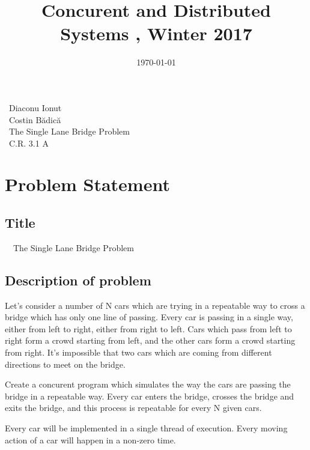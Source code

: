 \documentclass{article}
\begin{document}

\title{Concurent and Distributed Systems , Winter 2017}



\date{\today}
\maketitle

\begin{tabbing}
 \ {Diaconu Ionut }\\
  \  {Costin B\u{a}dic\u{a} } \\
\ The Single Lane Bridge Problem  \\
      \ C.R. 3.1 A \\

\end{tabbing}

\pagebreak
\tableofcontents \textcolor{blue}
\pagebreak

\section{Problem Statement}
\subsection{Title}
\ \ The Single Lane Bridge Problem
\subsection {Description of problem} 
Let's consider a number of N cars which are trying in a repeatable way to cross a bridge which has only one line of passing. Every car is passing in a single way, either from left to right, either from right to left. Cars which pass from left to right form a crowd starting from left, and the other cars form a crowd starting from right. It's impossible that two cars which are coming from different directions to meet on the bridge.  \par
Create a concurent program which simulates the way the cars are passing the bridge in a repeatable way. Every car enters the bridge, crosses the bridge and exits the bridge, and this process is repeatable for every N given cars. \par
Every car will be implemented in a single thread of execution. Every moving action of a car will happen in a non-zero time. \par
\end{document}
